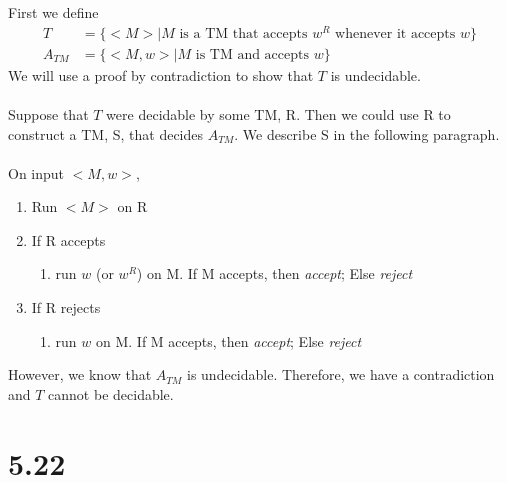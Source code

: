 \documentclass{article}
\begin{document}
First we define
\begin{align*}
    T &= \{ <M> | M \textrm{ is a TM that accepts } w^R  \textrm{ whenever it accepts } w \}\\
    A_{TM} &= \{ <M, w> | M \textrm{ is TM and accepts } w \} 
\end{align*} 
We will use a proof by contradiction to show that $T$ is undecidable.\\\\
Suppose that $T$ were decidable by some TM, R. Then we could use R to construct a TM, S, that decides $A_{TM}$. We describe S in the following paragraph.\\\\
On input $<M, w>$, 
\begin{enumerate}
    \item Run $<M>$ on R
    \item If R accepts
    \begin{enumerate}
        \item run $w$ (or $w^R$) on M. If M accepts, then \textit{accept}; Else \textit{reject}
    \end{enumerate}
    \item If R rejects
    \begin{enumerate}
        \item run $w$ on M. If M accepts, then \textit{accept}; Else \textit{reject}
    \end{enumerate}
\end{enumerate}
However, we know that $A_{TM}$ is undecidable. Therefore, we have a contradiction and $T$ cannot be decidable.

\section*{5.22}
\end{document}
